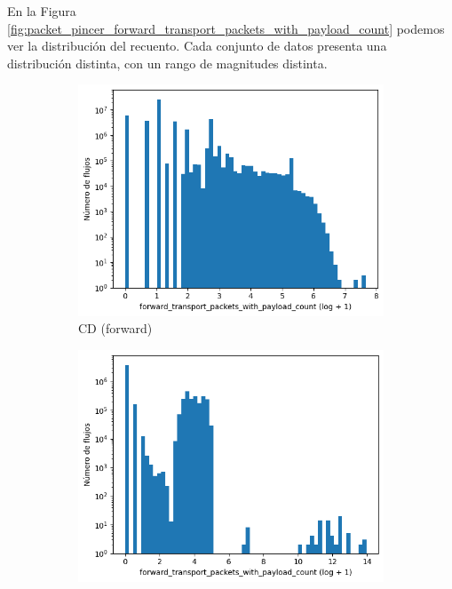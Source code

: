 En la Figura \ref{fig:packet_pincer_forward_transport_packets_with_payload_count} podemos ver la distribución del recuento. Cada conjunto de datos presenta una distribución distinta, con un rango de magnitudes distinta.

\begin{figure}[H]
    \centering
    \begin{subfigure}[b]{0.32\textwidth}
        \centering
        \includegraphics[width=\textwidth]{media/packet_pincer_cicddos/forward_transport_packets_with_payload_count_log_x_log_y.png}
        \caption{CD (forward)}
    \end{subfigure}
    \hfill
    \begin{subfigure}[b]{0.32\textwidth}
        \centering
        \includegraphics[width=\linewidth]{media/packet_pincer_botiot/forward_transport_packets_with_payload_count_log_x_log_y.png}

\end{subfigure}
\end{figure}
